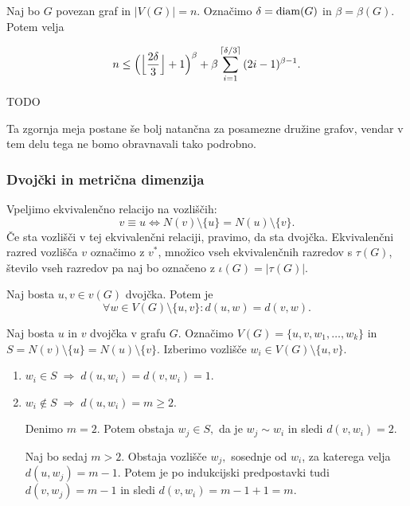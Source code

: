 \documentclass[mat1, tisk]{fmfdelo}
\newcommand{\1}{(1, 1, \ldots, 1)}
\newcommand{\2}{(2, 2, \ldots, 2)}
\begin{document}
\begin{trditev} \label{trd:meja_mdim_premer}
    Naj bo $G$ povezan graf in $|V(G)| = n$. Označimo $ \delta = {\rm diam}(G)$ in 
    $\beta = \beta (G)$. Potem velja

    $$n \leq \Bigl ( \Bigl \lfloor {\frac{2 \delta}{3}}\Bigr \rfloor + 1 \Bigr )^{\beta} + 
    \beta \sum_{i = 1}^{\lceil \delta /3 \rceil} {(2i - 1)^{\beta - 1}}. $$
\end{trditev}

\begin{dokaz}
    TODO
\end{dokaz}

Ta zgornja meja postane še bolj natančna za posamezne družine grafov, vendar v tem delu
tega ne bomo obravnavali tako podrobno.




\subsubsection{Dvojčki in metrična dimenzija} \label{ss:dvojcki_mdim}

Vpeljimo ekvivalenčno relacijo na vozliščih:
\begin{equation}\label{eq:dvojcki}
v \equiv u \Leftrightarrow N(v)\setminus \{u\} = N(u) \setminus \{v\}.
\end{equation}
Če sta vozlišči v tej ekvivalenčni relaciji, pravimo, da sta dvojčka. 
Ekvivalenčni razred vozlišča $v$ označimo z $v^{*}$, 
množico vseh ekvivalenčnih razredov s $\tau (G)$, število vseh razredov pa naj bo označeno 
z $\iota(G) = |\tau(G)|.$


\begin{lema} \label{lema:dvojcki_razdalje}
    Naj bosta $u, v \in v(G)$ dvojčka. Potem je 
    $$\forall w \in V(G) \setminus \{u, v\} : d(u, w) = d(v, w).$$
\end{lema}

\begin{dokaz}
    Naj bosta $u$ in $v$ dvojčka v grafu $G$. Označimo $V(G) = \{u, v, w_1, \ldots, w_k\}$ 
    in $S = N(v)\setminus \{u\} = N(u) \setminus \{v\}$. Izberimo vozlišče 
    $w_i \in V(G) \setminus \{u, v\}.$
    \begin{enumerate}
        \item $w_i \in S \; \Rightarrow \; d(u, w_i) = d(v, w_i) = 1.$
        \item $w_i \notin S \; \Rightarrow \; d(u, w_i) = m \geq 2$. 
    
        Denimo $m=2.$ Potem obstaja $w_j \in S,$ da je $w_j \sim w_i$ in sledi $d(v, w_i) = 2.$
        
        Naj bo sedaj $m > 2.$ Obstaja vozlišče $w_j,$ sosednje od $w_i$, za katerega velja 
        $d(u, w_j) = m-1.$ Potem je po indukcijski predpostavki tudi $d(v, w_j) = m-1$ in 
        sledi $d(v, w_i) = m-1 + 1 = m.$
    \end{enumerate}
\end{dokaz}
\end{document}
